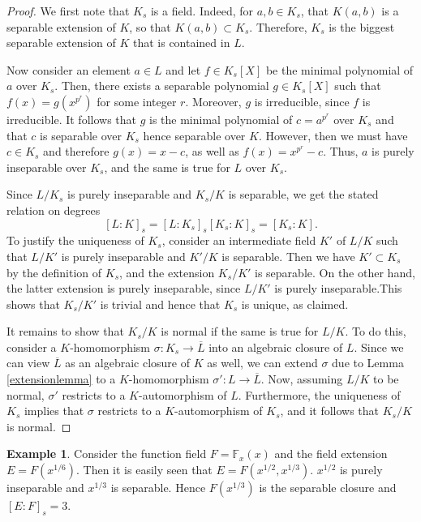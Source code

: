 \documentclass[12pt]{report}
\theoremstyle{definition}
\newtheorem{example}[theorem]{Example}
\newcommand{\FF}{\mathbb{F}}
\begin{document}
\begin{proof}
	We first note that $K_s$ is a field. Indeed, for $a, b\in K_s$, that $K(a, b)$ is a separable extension of $K$, so that $K(a, b) \subset K_s$. Therefore, $K_s$ is the biggest separable extension of $K$ that is contained in $L$.

	Now consider an element $a\in L$ and let $f\in K_s[X]$ be the minimal polynomial of $a$ over $K_s$. Then, there exists a separable polynomial $g\in K_s[X]$ such that $f(x) = g(x^{p^r})$ for some integer $r$. Moreover, $g$ is irreducible, since $f$ is irreducible. It follows that $g$ is the minimal polynomial of $c = a^{p^r}$ over $K_s$ and that $c$ is separable over $K_s$ hence separable over $K$. However, then we must have $c\in K_s$ and therefore $g(x) = x - c$, as well as $f(x) = x^{p^r} - c$. Thus, $a$ is purely inseparable over $K_s$, and the same is true for $L$ over $K_s$.


	Since $L/K_s$ is purely inseparable and $K_s/K$ is separable, we get the stated relation on degrees $$[L:K]_s=[L:K_s]_s[K_s:K]_s=[K_s:K].$$
	To justify the uniqueness of $K_s$, consider an intermediate field $K'$ of $L/K$ such that $L/K'$ is purely inseparable and $K'/K$ is separable. Then we have $K' \subset K_s$ by the definition of $K_s$, and the extension $K_s/K'$ is separable. On the other hand, the latter extension is purely inseparable, since $L/K'$ is purely inseparable.This shows that $K_s/K'$ is trivial and hence that $K_s$ is unique, as claimed.


	It remains to show that $K_s/K$ is normal if the same is true for $L/K$. To do this, consider a $K$-homomorphism $\sigma : K_s\to \overline{L}$ into an algebraic closure of $L$. Since we can view $\overline{L}$ as an algebraic closure of $K$ as well, we can extend $\sigma$ due to Lemma \ref{extensionlemma} to a $K$-homomorphism $\sigma' : L\to \overline{L}$. Now, assuming $L/K$ to be normal, $\sigma'$ restricts to a $K$-automorphism of $L$. Furthermore, the uniqueness of $K_s$ implies that $\sigma$ restricts to a $K$-automorphism of $K_s$, and it follows that $K_s/K$ is normal.
\end{proof}

\begin{example}
	Consider the function field $F=\FF_x(x)$ and the field extension $E=F(x^{1/6})$. Then it is easily seen that $E=F(x^{1/2},x^{1/3})$. $x^{1/2}$ is purely inseparable and $x^{1/3}$ is separable. Hence $F(x^{1/3})$ is the separable closure and $[E:F]_s=3$.
\end{example}
\end{document}

